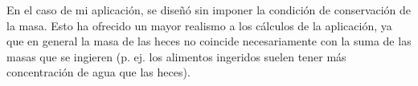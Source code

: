 
En el caso de mi aplicación, se diseñó sin imponer la condición de conservación de la masa. Esto ha ofrecido un mayor realismo a los cálculos de la aplicación, ya que en general la masa de las heces no coincide necesariamente con la suma de las masas que se ingieren (p. ej. los alimentos ingeridos suelen tener más concentración de agua que las heces).

\newpage

	



